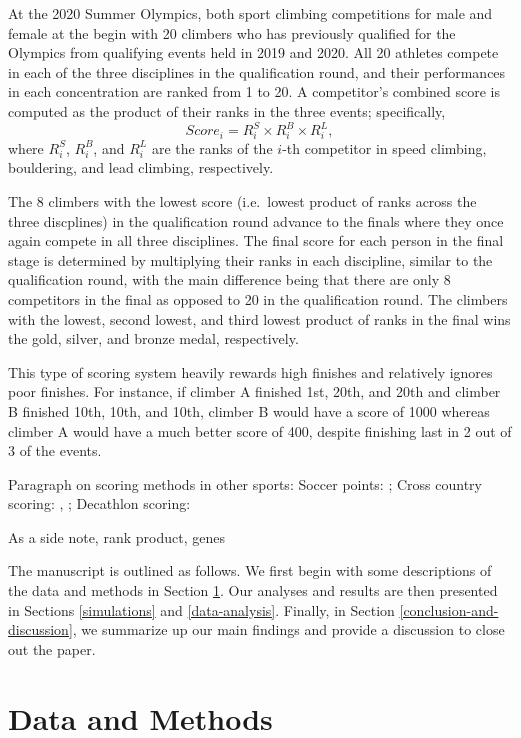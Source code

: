 \documentclass[12pt]{article}
\begin{document}
At the 2020 Summer Olympics, both sport climbing competitions for male
and female at the begin with 20 climbers who has previously qualified
for the Olympics from qualifying events held in 2019 and 2020. All 20
athletes compete in each of the three disciplines in the qualification
round, and their performances in each concentration are ranked from 1 to
20. A competitor's combined score is computed as the product of their
ranks in the three events; specifically, \begin{equation}
Score_i = R^S_i\times R^B_i\times R^L_i,
\end{equation} where \(R^S_i\), \(R^B_i\), and \(R^L_i\) are the ranks
of the \(i\)-th competitor in speed climbing, bouldering, and lead
climbing, respectively.

The 8 climbers with the lowest score (i.e.~lowest product of ranks
across the three discplines) in the qualification round advance to the
finals where they once again compete in all three disciplines. The final
score for each person in the final stage is determined by multiplying
their ranks in each discipline, similar to the qualification round, with
the main difference being that there are only 8 competitors in the final
as opposed to 20 in the qualification round. The climbers with the
lowest, second lowest, and third lowest product of ranks in the final
wins the gold, silver, and bronze medal, respectively.

This type of scoring system heavily rewards high finishes and relatively
ignores poor finishes. For instance, if climber A finished 1st, 20th,
and 20th and climber B finished 10th, 10th, and 10th, climber B would
have a score of 1000 whereas climber A would have a much better score of
400, despite finishing last in 2 out of 3 of the events.

Paragraph on scoring methods in other sports: Soccer points:
\citet{haugen2008}; Cross country scoring: \citet{hammond2007},
\citet{boudreau2018}; Decathlon scoring: \citet{westera2006}

As a side note, rank product, genes

The manuscript is outlined as follows. We first begin with some
descriptions of the data and methods in Section \ref{data-and-methods}.
Our analyses and results are then presented in Sections
\ref{simulations} and \ref{data-analysis}. Finally, in Section
\ref{conclusion-and-discussion}, we summarize up our main findings and
provide a discussion to close out the paper.

\hypertarget{data-and-methods}{%
\section{Data and Methods}\label{data-and-methods}}
\end{document}
